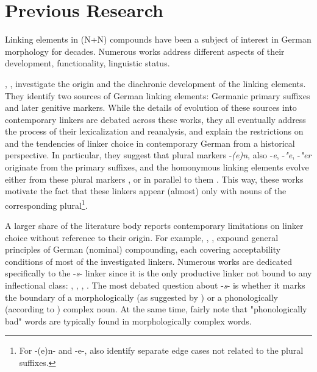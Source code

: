 \documentclass[10pt, a4paper]{article}
\begin{document}



\section{Previous Research}
\label{sec:back}

Linking elements in (N+N) compounds have been a subject of interest in German morphology for decades. Numerous works address different aspects of their development, functionality, linguistic status.

\citet{nuebling_szczepaniak_2013}, \citet{wegener_2003}, \citet{wegener_2005} investigate the origin and the diachronic development of the linking elements. They identify two sources of German linking elements: Germanic primary suffixes and later genitive markers. While the details of evolution of these sources into contemporary linkers are debated across these works, they all eventually address the process of their lexicalization and reanalysis, and explain the restrictions on and the tendencies of linker choice in contemporary German from a historical perspective. In particular, they suggest that plural markers -\textit{(e)n}, also -\textit{e}, -\textit{"e}, -\textit{"er} originate from the primary suffixes, and the homonymous linking elements evolve either from these plural markers \citep{nuebling_szczepaniak_2013}, or in parallel to them \citep{wegener_2003}. This way, these works motivate the fact that these linkers appear (almost) only with nouns of the corresponding plural\footnote{For -(e)n- and -e-, \citet{nuebling_szczepaniak_2013} also identify separate edge cases not related to the plural suffixes.}. 

A larger share of the literature body reports contemporary limitations on linker choice without reference to their origin. For example, \citet[chapter 6.2]{eisenberg_2013}, \citet[chapter A.5]{ortner_mueller-bollhagen_1991}, \citet[chapter 8.1]{schaefer_2018} expound general principles of German (nominal) compounding, each covering acceptability conditions of most of the investigated linkers. Numerous works are dedicated specifically to the -\textit{s}- linker since it is the only productive linker not bound to any inflectional class: \citet{libben_etal_2009}, \citet{kopf_2017}, \citet{kuerschner_2005}, \citet{nuebling_szczepaniak_2008}. The most debated question about -\textit{s}- is whether it marks the boundary of a morphologically (as suggested by \citealp{kuerschner_2005}) or a phonologically (according to \citealp{nuebling_szczepaniak_2008}) complex noun. At the same time, \citet{fuhrhop_kuerschner_2015} fairly note that "phonologically bad" words are typically found in morphologically complex words. 
\end{document}
